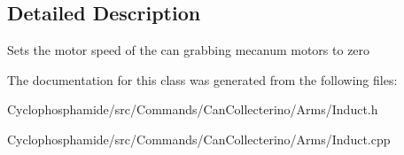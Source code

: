 \subsection{Detailed Description}
Sets the motor speed of the can grabbing mecanum motors to zero 

The documentation for this class was generated from the following files\+:\begin{DoxyCompactItemize}
\item 
Cyclophosphamide/src/\+Commands/\+Can\+Collecterino/\+Arms/Induct.\+h\item 
Cyclophosphamide/src/\+Commands/\+Can\+Collecterino/\+Arms/Induct.\+cpp\end{DoxyCompactItemize}
